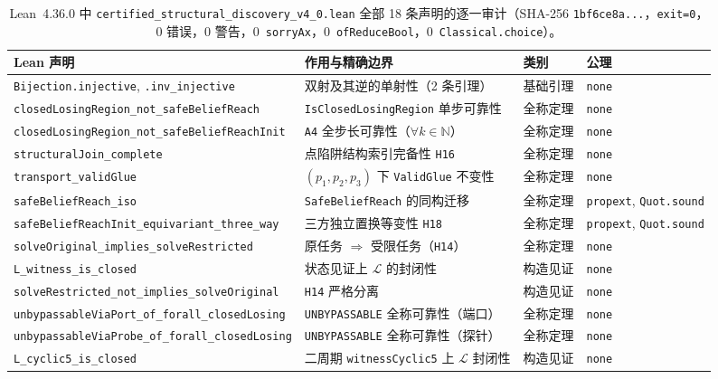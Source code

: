 \documentclass[10pt,a4paper]{article}
\newcommand{\code}[1]{\nolinkurl{#1}}
\begin{document}
\begin{table}[!htbp]
\centering
\caption{Lean~4.36.0 中 \code{certified_structural_discovery_v4_0.lean} 全部 18 条声明的逐一审计（SHA-256 \code{1bf6ce8a...}，\code{exit=0}，0 错误，0 警告，0~\code{sorryAx}，0~\code{ofReduceBool}，0~\code{Classical.choice}）。}
\label{tab:lean-audit}
\footnotesize
\renewcommand{\arraystretch}{1.12}
\begin{tabularx}{\linewidth}{@{}>{\raggedright\arraybackslash}p{6.5cm}>{\raggedright\arraybackslash}Xll@{}}
\toprule
\textbf{Lean 声明} & \textbf{作用与精确边界} & \textbf{类别} & \textbf{公理} \\
\midrule
\code{Bijection.injective}, \code{.inv_injective} & 双射及其逆的单射性（2 条引理） & 基础引理 & \code{none} \\
\code{closedLosingRegion_not_safeBeliefReach} & \code{IsClosedLosingRegion} 单步可靠性 & 全称定理 & \code{none} \\
\code{closedLosingRegion_not_safeBeliefReachInit} & \code{A4} 全步长可靠性（$\forall k \in \mathbb{N}$） & 全称定理 & \code{none} \\
\code{structuralJoin_complete} & 点陷阱结构索引完备性 \code{H16} & 全称定理 & \code{none} \\
\code{transport_validGlue} & $(p_1, p_2, p_3)$ 下 \code{ValidGlue} 不变性 & 全称定理 & \code{none} \\
\code{safeBeliefReach_iso} & \code{SafeBeliefReach} 的同构迁移 & 全称定理 & \texttt{propext}, \texttt{Quot.sound} \\
\code{safeBeliefReachInit_equivariant_three_way} & 三方独立置换等变性 \code{H18} & 全称定理 & \texttt{propext}, \texttt{Quot.sound} \\
\code{solveOriginal_implies_solveRestricted} & 原任务 $\Rightarrow$ 受限任务（\code{H14}） & 全称定理 & \code{none} \\
\code{L_witness_is_closed} & 4 状态见证上 $\mathcal{L}$ 的封闭性 & 构造见证 & \code{none} \\
\code{solveRestricted_not_implies_solveOriginal} & \code{H14} 严格分离 & 构造见证 & \code{none} \\
\code{unbypassableViaPort_of_forall_closedLosing} & \code{UNBYPASSABLE} 全称可靠性（端口） & 全称定理 & \code{none} \\
\code{unbypassableViaProbe_of_forall_closedLosing} & \code{UNBYPASSABLE} 全称可靠性（探针） & 全称定理 & \code{none} \\
\code{L_cyclic5_is_closed} & 二周期 \code{witnessCyclic5} 上 $\mathcal{L}$ 封闭性 & 构造见证 & \code{none} \\

\end{tabularx}
\end{table}
\end{document}
